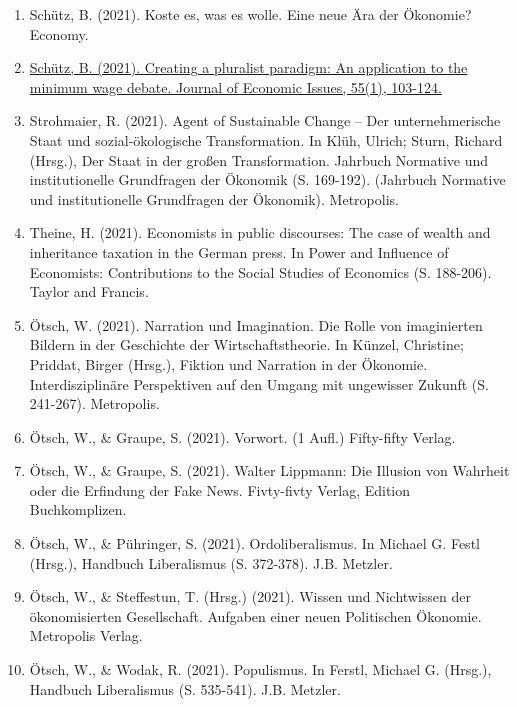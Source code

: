\begin{enumerate}
	 \item Schütz, B. (2021). \glqq Koste es, was es wolle\grqq{}. Eine neue Ära der Ökonomie? Economy.
	 \item \href{https://doi.org/10.1080/00213624.2021.1874786}{Schütz, B. (2021). Creating a pluralist paradigm: An application to the minimum wage debate. Journal of Economic Issues, 55(1), 103-124.}
	 \item Strohmaier, R. (2021). Agent of Sustainable Change -- Der unternehmerische Staat und sozial-ökologische Transformation. In Klüh, Ulrich; Sturn, Richard (Hrsg.), Der Staat in der großen Transformation. Jahrbuch Normative und institutionelle Grundfragen der Ökonomik (S. 169-192). (Jahrbuch Normative und institutionelle Grundfragen der Ökonomik). Metropolis.
	 \item Theine, H. (2021). Economists in public discourses: The case of wealth and inheritance taxation in the German press. In Power and Influence of Economists: Contributions to the Social Studies of Economics (S. 188-206). Taylor and Francis.
	 \item Ötsch, W. (2021). Narration und Imagination. Die Rolle von imaginierten Bildern in der Geschichte der Wirtschaftstheorie. In Künzel, Christine; Priddat, Birger (Hrsg.), Fiktion und Narration in der Ökonomie. Interdisziplinäre Perspektiven auf den Umgang mit ungewisser Zukunft (S. 241-267). Metropolis.
	 \item Ötsch, W., \& Graupe, S. (2021). Vorwort. (1 Aufl.) Fifty-fifty Verlag.
	 \item Ötsch, W., \& Graupe, S. (2021). Walter Lippmann: Die Illusion von Wahrheit oder die Erfindung der Fake News. Fivty-fivty Verlag, Edition Buchkomplizen.
	 \item Ötsch, W., \& Pühringer, S. (2021). Ordoliberalismus. In Michael G. Festl (Hrsg.), Handbuch Liberalismus (S. 372-378). J.B. Metzler.
	 \item Ötsch, W., \& Steffestun, T. (Hrsg.) (2021). Wissen und Nichtwissen der ökonomisierten Gesellschaft. Aufgaben einer neuen Politischen Ökonomie. Metropolis Verlag.
	 \item Ötsch, W., \& Wodak, R. (2021). Populismus. In Ferstl, Michael G. (Hrsg.), Handbuch Liberalismus (S. 535-541). J.B. Metzler.
\end{enumerate}
